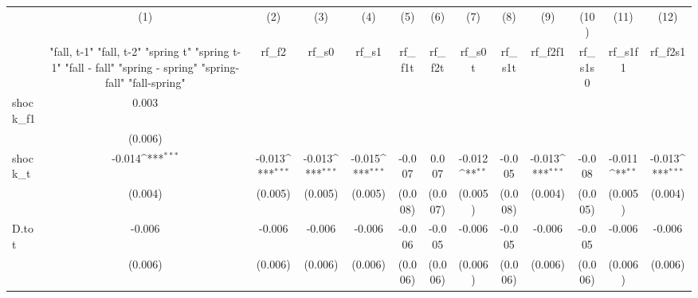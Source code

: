 {
\def\sym#1{\ifmmode^{#1}\else\(^{#1}\)\fi}
\begin{tabular}{l*{12}{c}}
\toprule
            &\multicolumn{1}{c}{(1)}&\multicolumn{1}{c}{(2)}&\multicolumn{1}{c}{(3)}&\multicolumn{1}{c}{(4)}&\multicolumn{1}{c}{(5)}&\multicolumn{1}{c}{(6)}&\multicolumn{1}{c}{(7)}&\multicolumn{1}{c}{(8)}&\multicolumn{1}{c}{(9)}&\multicolumn{1}{c}{(10)}&\multicolumn{1}{c}{(11)}&\multicolumn{1}{c}{(12)}\\
            &\multicolumn{1}{c}{  "fall, t-1" "fall, t-2" "spring t" "spring t-1"  "fall - fall" "spring - spring" "spring-fall" "fall-spring" }&\multicolumn{1}{c}{rf\_f2}&\multicolumn{1}{c}{rf\_s0}&\multicolumn{1}{c}{rf\_s1}&\multicolumn{1}{c}{rf\_f1t}&\multicolumn{1}{c}{rf\_f2t}&\multicolumn{1}{c}{rf\_s0t}&\multicolumn{1}{c}{rf\_s1t}&\multicolumn{1}{c}{rf\_f2f1}&\multicolumn{1}{c}{rf\_s1s0}&\multicolumn{1}{c}{rf\_s1f1}&\multicolumn{1}{c}{rf\_f2s1}\\
\midrule
shock\_f1    &       0.003         &                     &                     &                     &                     &                     &                     &                     &                     &                     &                     &                     \\
            &     (0.006)         &                     &                     &                     &                     &                     &                     &                     &                     &                     &                     &                     \\
\addlinespace
shock\_t     &      -0.014\sym{***}&      -0.013\sym{***}&      -0.013\sym{***}&      -0.015\sym{***}&      -0.007         &       0.007         &      -0.012\sym{**} &      -0.005         &      -0.013\sym{***}&      -0.008         &      -0.011\sym{**} &      -0.013\sym{***}\\
            &     (0.004)         &     (0.005)         &     (0.005)         &     (0.005)         &     (0.008)         &     (0.007)         &     (0.005)         &     (0.008)         &     (0.004)         &     (0.005)         &     (0.005)         &     (0.004)         \\
\addlinespace
D.tot       &      -0.006         &      -0.006         &      -0.006         &      -0.006         &      -0.006         &      -0.005         &      -0.006         &      -0.005         &      -0.006         &      -0.005         &      -0.006         &      -0.006         \\
            &     (0.006)         &     (0.006)         &     (0.006)         &     (0.006)         &     (0.006)         &     (0.006)         &     (0.006)         &     (0.006)         &     (0.006)         &     (0.006)         &     (0.006)         &     (0.006)         \\

\end{tabular}}
